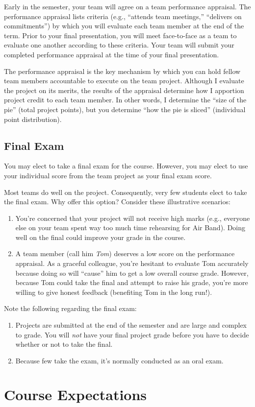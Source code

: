 \documentclass[11pt]{article}
\begin{document}
Early in the semester, your team will agree on a team performance appraisal.
The performance appraisal lists criteria (e.g., ``attends team meetings,''
``delivers on commitments'') by which you will evaluate each team member
at the end of the term.
Prior to your final presentation,
you will meet face-to-face as a team to evaluate one another according to these criteria.
Your team will submit your completed performance appraisal
at the time of your final presentation.

The performance appraisal is the key mechanism
by which you can hold fellow team members accountable to execute on the team project.
Although I evaluate the project on its merits,
the results of the appraisal determine how I apportion project credit
to each team member.
In other words,
I determine the ``size of the pie'' (total project points),
but you determine ``how the pie is sliced'' (individual point distribution).

\subsection{Final Exam}

You may elect to take a final exam for the course.
However, you may elect to use your individual score from the team
project as your final exam score.

Most teams do well on the project.
Consequently, very few students elect to take the final exam.
Why offer this option? Consider these illustrative scenarios:
\begin{enumerate}
\item You're concerned that your project will not receive high marks
  (e.g., everyone else on your team spent way too much time rehearsing for Air Band).
  Doing well on the final could improve your grade in the course.
\item A team member (call him \emph{Tom}) deserves a low score on the performance appraisal.
  As a graceful colleague, you're hesitant to evaluate Tom accurately
  because doing so will ``cause'' him to get a low overall course grade.
  However, because Tom could take the final and attempt to raise his grade,
  you're more willing to give honest feedback (benefiting Tom in the long run!).
\end{enumerate}
Note the following regarding the final exam:
\begin{enumerate}
\item Projects are submitted at the end of the semester
  and are large and complex to grade.
  You will \emph{not} have your final project grade
  before you have to decide whether or not to take the final.
\item Because few take the exam, it's normally conducted as an oral exam.
\end{enumerate}

\section{Course Expectations}


\end{document}
